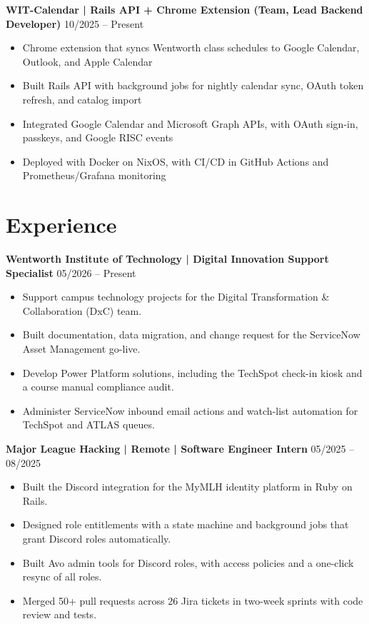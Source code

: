 \documentclass[10pt,letterpaper]{article}
\begin{document}
\vspace{4pt}
\noindent
\textbf{WIT-Calendar | Rails API + Chrome Extension (Team, Lead Backend Developer)} \hfill 10/2025 -- Present
\begin{itemize}
    \item Chrome extension that syncs Wentworth class schedules to Google Calendar, Outlook, and Apple Calendar
    \item Built Rails API with background jobs for nightly calendar sync, OAuth token refresh, and catalog import
    \item Integrated Google Calendar and Microsoft Graph APIs, with OAuth sign-in, passkeys, and Google RISC events
    \item Deployed with Docker on NixOS, with CI/CD in GitHub Actions and Prometheus/Grafana monitoring
\end{itemize}

\section{Experience}
\noindent
\textbf{Wentworth Institute of Technology | Digital Innovation Support Specialist} \hfill 05/2026 -- Present
\begin{itemize}
    \item Support campus technology projects for the Digital Transformation \& Collaboration (DxC) team.
    \item Built documentation, data migration, and change request for the ServiceNow Asset Management go-live.
    \item Develop Power Platform solutions, including the TechSpot check-in kiosk and a course manual compliance audit.
    \item Administer ServiceNow inbound email actions and watch-list automation for TechSpot and ATLAS queues.
\end{itemize}

\vspace{4pt}
\noindent
\textbf{Major League Hacking | Remote | Software Engineer Intern} \hfill 05/2025 -- 08/2025
\begin{itemize}
    \item Built the Discord integration for the MyMLH identity platform in Ruby on Rails.
    \item Designed role entitlements with a state machine and background jobs that grant Discord roles automatically.
    \item Built Avo admin tools for Discord roles, with access policies and a one-click resync of all roles.
    \item Merged 50+ pull requests across 26 Jira tickets in two-week sprints with code review and tests.
\end{itemize}
\end{document}
